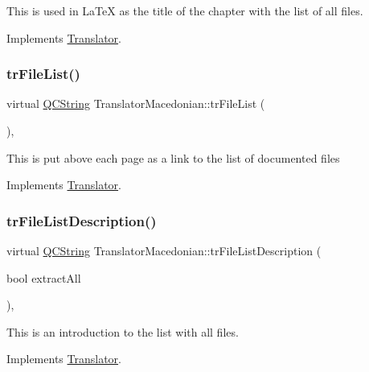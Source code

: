 This is used in La\+TeX as the title of the chapter with the list of all files. 

Implements \mbox{\hyperlink{class_translator}{Translator}}.

\mbox{\label{class_translator_macedonian_ab0980393cfabbea545642a0bc9369b6b}} 
\subsubsection{\texorpdfstring{trFileList()}{trFileList()}}
{\footnotesize\ttfamily virtual \mbox{\hyperlink{class_q_c_string}{Q\+C\+String}} Translator\+Macedonian\+::tr\+File\+List (\begin{DoxyParamCaption}{ }\end{DoxyParamCaption})\hspace{0.3cm}{\ttfamily [inline]}, {\ttfamily [virtual]}}

This is put above each page as a link to the list of documented files 

Implements \mbox{\hyperlink{class_translator}{Translator}}.

\mbox{\label{class_translator_macedonian_adf1d58a4908cd197d63d000dbe8e4724}} 
\subsubsection{\texorpdfstring{trFileListDescription()}{trFileListDescription()}}
{\footnotesize\ttfamily virtual \mbox{\hyperlink{class_q_c_string}{Q\+C\+String}} Translator\+Macedonian\+::tr\+File\+List\+Description (\begin{DoxyParamCaption}\item[{bool}]{extract\+All }\end{DoxyParamCaption})\hspace{0.3cm}{\ttfamily [inline]}, {\ttfamily [virtual]}}

This is an introduction to the list with all files. 

Implements \mbox{\hyperlink{class_translator}{Translator}}.

